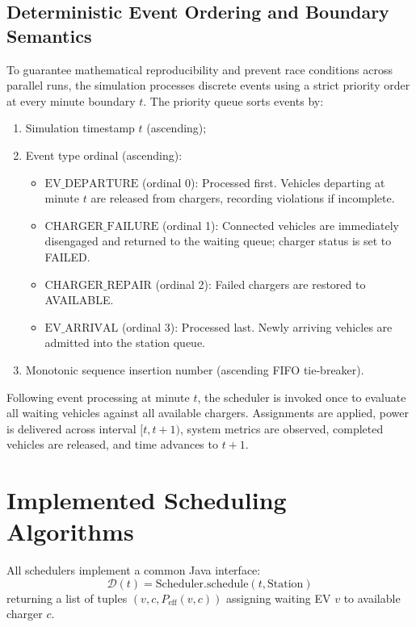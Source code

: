 \documentclass[conference]{IEEEtran}
\begin{document}
\subsection{Deterministic Event Ordering and Boundary Semantics}
To guarantee mathematical reproducibility and prevent race conditions across parallel runs, the simulation processes discrete events using a strict priority order at every minute boundary $t$. The priority queue sorts events by:
\begin{enumerate}
    \item Simulation timestamp $t$ (ascending);
    \item Event type ordinal (ascending):
    \begin{itemize}
        \item $\mathrm{EV\_DEPARTURE}$ (ordinal 0): Processed first. Vehicles departing at minute $t$ are released from chargers, recording violations if incomplete.
        \item $\mathrm{CHARGER\_FAILURE}$ (ordinal 1): Connected vehicles are immediately disengaged and returned to the waiting queue; charger status is set to FAILED.
        \item $\mathrm{CHARGER\_REPAIR}$ (ordinal 2): Failed chargers are restored to AVAILABLE.
        \item $\mathrm{EV\_ARRIVAL}$ (ordinal 3): Processed last. Newly arriving vehicles are admitted into the station queue.
    \end{itemize}
    \item Monotonic sequence insertion number (ascending FIFO tie-breaker).
\end{enumerate}

Following event processing at minute $t$, the scheduler is invoked once to evaluate all waiting vehicles against all available chargers. Assignments are applied, power is delivered across interval $[t, t+1)$, system metrics are observed, completed vehicles are released, and time advances to $t+1$.

\section{Implemented Scheduling Algorithms}
\label{sec:schedulers}
All schedulers implement a common Java interface:
\begin{equation*}
\mathcal{D}(t) = \mathrm{Scheduler}.\mathrm{schedule}(t, \mathrm{Station})
\end{equation*}
returning a list of tuples $(v, c, P_{\mathrm{eff}}(v, c))$ assigning waiting EV $v$ to available charger $c$.
\end{document}
